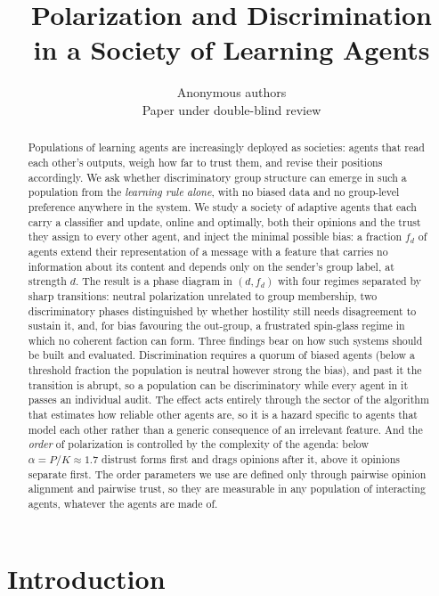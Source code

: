 \documentclass{article}
\title{Polarization and Discrimination \\ in a Society of Learning Agents}
\author{Anonymous authors\\Paper under double-blind review}
\newcommand{\fd}{f_{d}}
\begin{document}
\maketitle

\begin{abstract}
Populations of learning agents are increasingly deployed as societies: agents that
read each other's outputs, weigh how far to trust them, and revise their positions
accordingly. We ask whether discriminatory group structure can emerge in such a
population from the \emph{learning rule alone}, with no biased data and no
group-level preference anywhere in the system. We study a society of adaptive
agents that each carry a classifier and update, online and optimally, both their
opinions and the trust they assign to every other agent, and inject the minimal
possible bias: a fraction $\fd$ of agents extend their representation of a message
with a feature that carries no information about its content and depends only on
the sender's group label, at strength $d$. The result is a phase diagram in
$(d,\fd)$ with four regimes separated by sharp transitions: neutral polarization
unrelated to group membership, two discriminatory phases distinguished by whether
hostility still needs disagreement to sustain it, and, for bias favouring the
out-group, a frustrated spin-glass regime in which no coherent faction can form.
Three findings bear on how such systems should be built and evaluated.
Discrimination requires a quorum of biased agents (below a threshold fraction the population is neutral
however strong the bias), and past it the transition is
abrupt, so a population can be discriminatory while every agent in it passes an
individual audit. The effect acts entirely through the sector of the algorithm
that estimates how reliable other agents are, so it is a hazard specific to agents
that model each other rather than a generic consequence of an irrelevant feature.
And the \emph{order} of polarization is controlled by the complexity of the agenda:
below $\alpha = P/K \approx 1.7$ distrust forms first and drags opinions after it,
above it opinions separate first. The order parameters we use are defined only
through pairwise opinion alignment and pairwise trust, so they are measurable in
any population of interacting agents, whatever the agents are made of.
\end{abstract}

\section{Introduction}
\label{sec:intro}
\end{document}
